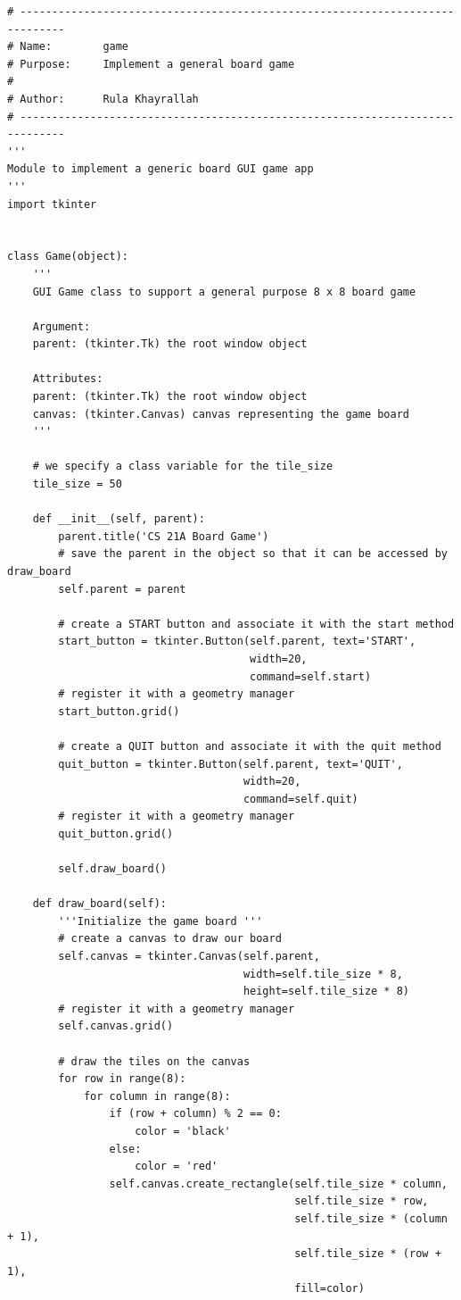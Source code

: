 \documentclass{article}
\begin{document}
\begin{lstlisting}
# -----------------------------------------------------------------------------
# Name:        game
# Purpose:     Implement a general board game
#
# Author:      Rula Khayrallah
# -----------------------------------------------------------------------------
'''
Module to implement a generic board GUI game app
'''
import tkinter


class Game(object):
    '''
    GUI Game class to support a general purpose 8 x 8 board game

    Argument:
    parent: (tkinter.Tk) the root window object

    Attributes:
    parent: (tkinter.Tk) the root window object
    canvas: (tkinter.Canvas) canvas representing the game board
    '''

    # we specify a class variable for the tile_size
    tile_size = 50

    def __init__(self, parent):
        parent.title('CS 21A Board Game')
        # save the parent in the object so that it can be accessed by draw_board
        self.parent = parent

        # create a START button and associate it with the start method
        start_button = tkinter.Button(self.parent, text='START',
                                      width=20,
                                      command=self.start)
        # register it with a geometry manager
        start_button.grid()

        # create a QUIT button and associate it with the quit method
        quit_button = tkinter.Button(self.parent, text='QUIT',
                                     width=20,
                                     command=self.quit)
        # register it with a geometry manager
        quit_button.grid()

        self.draw_board()

    def draw_board(self):
        '''Initialize the game board '''
        # create a canvas to draw our board
        self.canvas = tkinter.Canvas(self.parent,
                                     width=self.tile_size * 8,
                                     height=self.tile_size * 8)
        # register it with a geometry manager
        self.canvas.grid()

        # draw the tiles on the canvas
        for row in range(8):
            for column in range(8):
                if (row + column) % 2 == 0:
                    color = 'black'
                else:
                    color = 'red'
                self.canvas.create_rectangle(self.tile_size * column,
                                             self.tile_size * row,
                                             self.tile_size * (column + 1),
                                             self.tile_size * (row + 1),
                                             fill=color)


\end{lstlisting}
\end{document}
